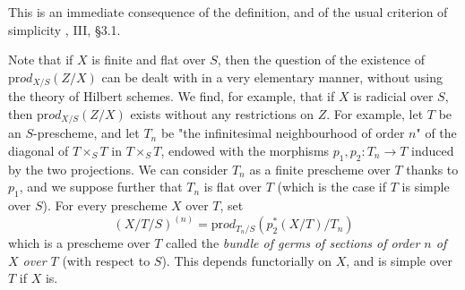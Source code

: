 \begin{cproof}
  This is an immediate consequence of the definition, and of the usual criterion of simplicity \cite{Gro1960b}, III, §3.1.
\end{cproof}


Note that if $X$ is finite and flat over $S$, then the question of the existence of $\mathrm{pr}od_{X/S}(Z/X)$ can be dealt with in a very elementary manner, without using the theory of Hilbert schemes.
We find, for example, that if $X$ is radicial over $S$, then $\mathrm{pr}od_{X/S}(Z/X)$ exists without any restrictions on $Z$.
For example, let $T$ be an $S$-prescheme, and let $T_n$ be "the infinitesimal neighbourhood of order $n$" of the diagonal of $T\times_S T$ in $T\times_S T$, endowed with the morphisms $p_1,p_2\colon T_n\to T$ induced by the two projections.
We can consider $T_n$ as a finite prescheme over $T$ thanks to $p_1$, and we suppose further that $T_n$ is flat over $T$ (which is the case if $T$ is simple over $S$).
For every prescheme $X$ over $T$, set
\[(X/T/S)^{(n)} = \mathrm{pr}od_{T_n/S}(p_2^*(X/T)/T_n)\]
which is a prescheme over $T$ called the \emph{bundle of germs of sections of order $n$ of $X$ over $T$} (with respect to $S$).
This depends functorially on $X$, and is simple over $T$ if $X$ is.

